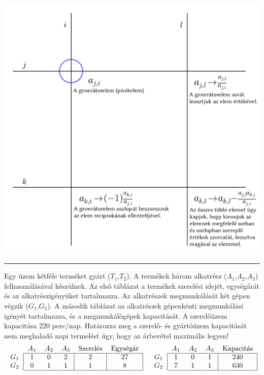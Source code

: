 \documentclass[a4paper,12pt,svgnames]{report}
\begin{document}
\begin{center}
\includegraphics[scale=0.75]{opkut.png}
\end{center}
\medskip\hrule\medskip
\indent Egy üzem kétféle terméket gyárt ($T_1$,$T_2$). A termékek három alkatrész ($A_1$,$A_2$,$A_3$) felhasználásával készülnek. Az első táblázat a termékek szerelési idejét, egységárát és az alkatrészigényüket tartalmazza. Az alkatrészek megmunkálását két gépen végzik ($G_1$,$G_2$). A második táblázat az alkatrészek gépenkénti megmunkálási igényét tartalmazza, és a megmunkálógépek kapacitását. A szerelőüzem kapacitása 220 perc/nap. Határozza meg a szerelő- és gyártóüzem kapacitását nem meghaladó napi termelést úgy, hogy az árbevétel maximális legyen!
\begin{align*}
\begin{tabular}{c|ccc|c|c|}
\multicolumn{1}{c}{}&\multicolumn{1}{c}{$A_1$}&\multicolumn{1}{c}{$A_2$}&
\multicolumn{1}{c}{$A_3$}&\multicolumn{1}{c}{Szerelés}&
\multicolumn{1}{c}{Egységár}\\\cline{2-6}
$G_1$&$1$&$0$&$2$&$2$&$27$\\
$G_2$&$0$&$1$&$1$&$1$&$8$\\\cline{2-6}
\end{tabular}&&
\begin{tabular}{c|ccc|c|}
\multicolumn{1}{c}{}&\multicolumn{1}{c}{$A_1$}&\multicolumn{1}{c}{$A_2$}&
\multicolumn{1}{c}{$A_3$}&\multicolumn{1}{c}{Kapacitás}\\\cline{2-5}
$G_1$&$1$&$0$&$1$&$240$\\
$G_2$&$7$&$1$&$1$&$630$\\\cline{2-5}
\end{tabular}
\end{align*}
\end{document}
